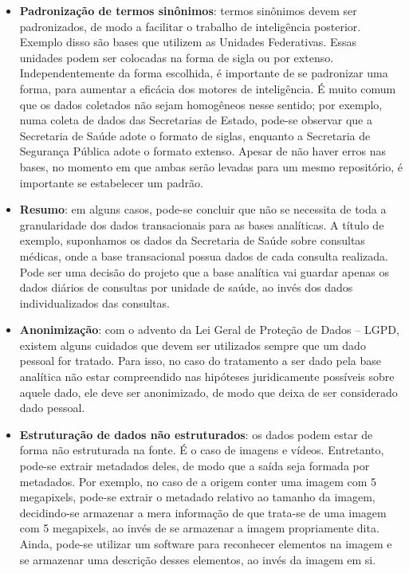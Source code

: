 \begin{itemize}
    \item \textbf{Padronização de termos sinônimos}: termos sinônimos devem ser padronizados, de modo a facilitar o trabalho de inteligência posterior. Exemplo disso são bases que utilizem as Unidades Federativas. Essas unidades podem ser colocadas na forma de sigla ou por extenso. Independentemente da forma escolhida, é importante de se padronizar uma forma, para aumentar a eficácia dos motores de inteligência. É muito comum que os dados coletados não sejam homogêneos nesse sentido; por exemplo, numa coleta de dados das Secretarias de Estado, pode-se observar que a Secretaria de Saúde adote o formato de siglas, enquanto a Secretaria de Segurança Pública adote o formato extenso. Apesar de não haver erros nas bases, no momento em que ambas serão levadas para um mesmo repositório, é importante se estabelecer um padrão.
    \item \textbf{Resumo}: em alguns casos, pode-se concluir que não se necessita de toda a granularidade dos dados transacionais para as bases analíticas. A título de exemplo, suponhamos os dados da Secretaria de Saúde sobre consultas médicas, onde a base transacional possua dados de cada consulta realizada. Pode ser uma decisão do projeto que a base analítica vai guardar apenas os dados diários de consultas por unidade de saúde, ao invés dos dados individualizados das consultas.
    \item \textbf{Anonimização}: com o advento da Lei Geral de Proteção de Dados -- LGPD, existem alguns cuidados que devem ser utilizados sempre que um dado pessoal for tratado. Para isso, no caso do tratamento a ser dado pela base analítica não estar compreendido nas hipóteses juridicamente possíveis sobre aquele dado, ele deve ser anonimizado, de modo que deixa de ser considerado dado pessoal.
    \item \textbf{Estruturação de dados não estruturados}: os dados podem estar de forma não estruturada na fonte. É o caso de imagens e vídeos. Entretanto, pode-se extrair metadados deles, de modo que a saída seja formada por metadados. Por exemplo, no caso de a origem conter uma imagem com 5 megapixels, pode-se extrair o metadado relativo ao tamanho da imagem, decidindo-se armazenar a mera informação de que trata-se de uma imagem com 5 megapixels, ao invés de se armazenar a imagem propriamente dita. Ainda, pode-se utilizar um software para reconhecer elementos na imagem e se armazenar uma descrição desses elementos, ao invés da imagem em si.
\end{itemize}

